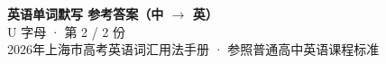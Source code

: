 \documentclass[10pt,a4paper]{article}
\begin{document}
\pagestyle{plain}

\begin{center}
{\LARGE\bfseries 英语单词默写 \quad 参考答案（中 $\to$ 英）}\\[0.22em]
{\large U 字母 · 第 2 / 2 份}\\[0.18em]
{\small 2026年上海市高考英语词汇用法手册 · 参照普通高中英语课程标准}
\end{center}

\vspace{0.2em}
\noindent{\color{rulegray}\rule{\textwidth}{0.8pt}}

\vspace{0.35em}

\vspace{0.25em}
\renewcommand{\arraystretch}{1.32}
\end{document}
